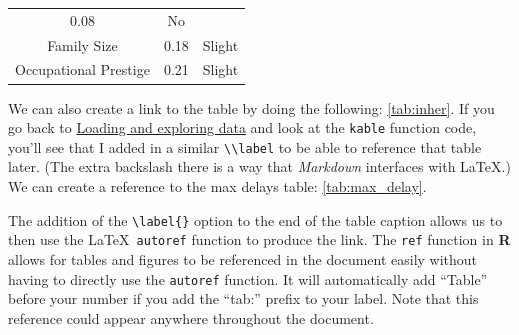 \documentclass[12pt,twoside]{reedthesis}
\begin{document}
\begin{longtable}[]{@{}ccc@{}}
\begin{minipage}[t]{0.47\columnwidth}
  0.08\strut
  \end{minipage} & \begin{minipage}[t]{0.16\columnwidth}\centering\strut
  No\strut
  \end{minipage}\tabularnewline
  \begin{minipage}[t]{0.29\columnwidth}\centering\strut
  Family Size\strut
  \end{minipage} & \begin{minipage}[t]{0.47\columnwidth}\centering\strut
  0.18\strut
  \end{minipage} & \begin{minipage}[t]{0.16\columnwidth}\centering\strut
  Slight\strut
  \end{minipage}\tabularnewline
  \begin{minipage}[t]{0.29\columnwidth}\centering\strut
  Occupational Prestige\strut
  \end{minipage} & \begin{minipage}[t]{0.47\columnwidth}\centering\strut
  0.21\strut
  \end{minipage} & \begin{minipage}[t]{0.16\columnwidth}\centering\strut
  Slight\strut
  \end{minipage}\tabularnewline
  \bottomrule
  \end{longtable}
  
  We can also create a link to the table by doing the following:
  \autoref{tab:inher}. If you go back to
  \protect\hyperlink{loading-and-exploring-data}{Loading and exploring
  data} and look at the \texttt{kable} function code, you'll see that I
  added in a similar \texttt{\textbackslash{}\textbackslash{}label} to be
  able to reference that table later. (The extra backslash there is a way
  that \emph{Markdown} interfaces with \LaTeX.) We can create a reference
  to the max delays table: \autoref{tab:max_delay}.
  
  The addition of the \texttt{\textbackslash{}label\{\}} option to the end
  of the table caption allows us to then use the \LaTeX~\texttt{autoref}
  function to produce the link. The \texttt{ref} function in \textbf{R}
  allows for tables and figures to be referenced in the document easily
  without having to directly use the \texttt{autoref} function. It will
  automatically add ``Table'' before your number if you add the ``tab:''
  prefix to your label. Note that this reference could appear anywhere
  throughout the document.
  
  \clearpage
  
\end{document}
